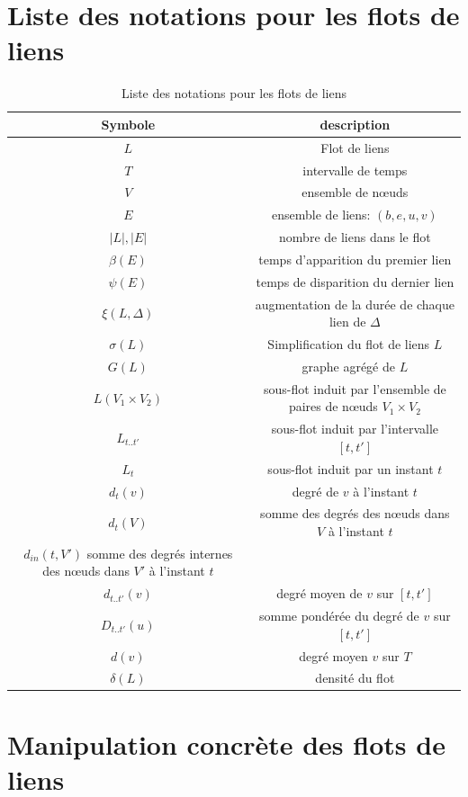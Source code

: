 \section{Liste des notations pour les flots de liens}
\begin{table}[h]
	\centering
	\begin{tabular}{|c|c|}
	\hline Symbole & description \\
	\hline $L$ & Flot de liens \\ 
	$T$ & intervalle de temps  \\
	$V$ & ensemble de n\oe uds\\
	$E$ & ensemble de liens: $(b,e,u,v)$ \\
	$|L|,|E|$ & nombre de liens dans le flot \\
	$\beta(E)$ & temps d'apparition du premier lien\\
	$\psi(E)$ & temps de disparition du dernier lien\\
	$\xi(L,\Delta)$ & augmentation de la durée de chaque lien de $\Delta$\\
	$\sigma(L)$ & Simplification du flot de liens $L$\\
	$G(L)$ & graphe agrégé de $L$\\
	$L(V_1\times V_2)$ & sous-flot induit par l'ensemble de paires de n\oe uds $V_1\times V_2$ \\
	$L_{t..t'}$ & sous-flot induit par l'intervalle $[t,t']$ \\
	$L_{t}$ & sous-flot induit par un instant $t$\\
	$d_t(v)$ & degré de $v$ à l'instant $t$\\
	$d_t(V)$ & somme des degrés des n\oe uds dans $V$ à l'instant $t$\\
	$d_{in}(t,V')$ somme des degrés internes des n\oe uds dans $V'$ à l'instant $t$\\
	$d_{t..t'}(v)$ & degré moyen de $v$ sur $[t,t']$\\
	$D_{t..t'}(u)$ & somme pondérée du degré de $v$ sur $[t,t']$\\
	$d(v)$ & degré moyen $v$ sur $T$\\
	$\delta(L)$ & densité du flot\\
	\hline
	\end{tabular} 
		\caption{Liste des notations pour les flots de liens}
\end{table}

\section{Manipulation concrète des flots de liens}

